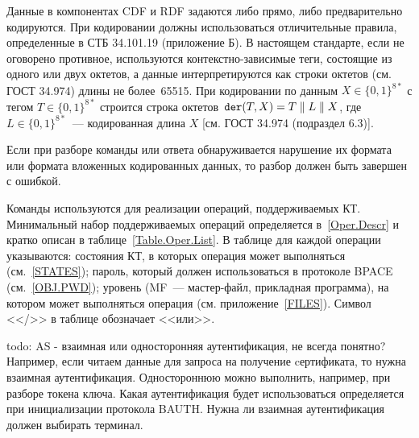 Данные в компонентах CDF и RDF задаются либо прямо, либо предварительно кодируются. 
При кодировании должны использоваться отличительные правила, определенные в СТБ 34.101.19 
(приложение Б). В настоящем стандарте, если не оговорено противное, используются 
контекстно-зависимые теги, состоящие из одного или двух октетов, а данные 
интерпретируются как строки октетов (см. ГОСТ 34.974) длины не более~65515. 
При кодировании по данным $X\in\{0,1\}^{8*}$ с тегом $T\in\{0,1\}^{8*}$ строится 
строка октетов~$\texttt{der}(T, X) = T \parallel L \parallel X$, 
где $L\in\{0,1\}^{8*}$~--- кодированная длина $X$ [см. ГОСТ 34.974 (подраздел 
6.3)].  

Если при разборе команды или ответа обнаруживается нарушение их 
формата или формата вложенных кодированных данных, то разбор 
должен быть завершен с ошибкой. 

Команды используются для реализации операций, поддерживаемых КТ.
Минимальный набор поддерживаемых операций определяется в~\ref{Oper.Descr}
и кратко описан в таблице~\ref{Table.Oper.List}. 
%
В таблице для каждой операции указываются: состояния КТ, 
в которых операция может выполняться (см.~\ref{STATES});
пароль, который должен использоваться 
в протоколе BPACE (см.~\ref{OBJ.PWD}); 
уровень (MF~--- мастер-файл, прикладная программа), 
на котором может выполняться операция 
(см. приложение~\ref{FILES}).
Символ <</>> в таблице обозначает <<или>>.

 todo: AS - взаимная или односторонняя аутентификация, не всегда понятно? 
 Например, если читаем данные для запроса на получение cертификата,
 то нужна взаимная аутентификация. Одностороннюю можно выполнить, например,
 при разборе токена ключа. 
 Какая аутентификация будет использоваться определяется при инициализации
 протокола BAUTH. Нужна ли взаимная аутентификация должен выбирать терминал.
\fi


